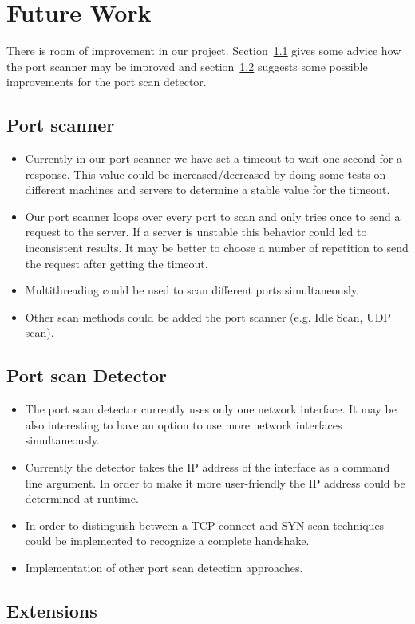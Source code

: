 \documentclass[a4paper]{scrreprt}
\begin{document}



\chapter{Future Work}
There is room of improvement in our project. Section~\ref{sec:improve:scan} gives some advice how the port scanner may be improved and section~\ref{sec:improve:detector} suggests some 
possible improvements for the port scan detector. 
\section{Port scanner}
\label{sec:improve:scan}
\begin{itemize}
\item Currently in our port scanner we have set a timeout to wait one second for a response. This value could be increased/decreased by
doing some tests on different machines and servers to determine a stable value for the timeout.
\item Our port scanner loops over every port to scan and only tries once to send a request to the server. If a server is unstable this behavior could
led to inconsistent results. It may be better to choose a number of repetition to send the request after getting the timeout.
\item Multithreading could be used to scan different ports simultaneously. 
\item Other scan methods could be added the port scanner (e.g. Idle Scan, UDP scan).
\end{itemize}
\section{Port scan Detector}
\label{sec:improve:detector}
\begin{itemize}
\item The port scan detector currently uses only one network interface. It may be also interesting to have an option to use more network interfaces simultaneously.
\item Currently the detector takes the IP address of the interface as a command line argument. In order to make it more user-friendly the IP address could be determined at runtime.
\item In order to distinguish between a TCP connect and SYN scan techniques could be implemented to recognize a complete handshake.
\item Implementation of other port scan detection approaches.
	

\end{itemize}



\section{Extensions}


\newpage
\end{document}
